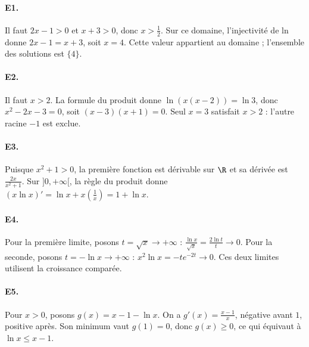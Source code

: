 \paragraph{E1.}Il faut $2x-1>0$ et $x+3>0$, donc $x>\frac{1}{2}$. Sur ce domaine, l'injectivité de ln donne $2x-1=x+3$, soit $x=4$. Cette valeur appartient au domaine ; l'ensemble des solutions est $\{4\}$.

\paragraph{E2.}Il faut $x>2$. La formule du produit donne $\ln(x(x-2))=\ln3$, donc $x^2-2x-3=0$, soit $(x-3)(x+1)=0$. Seul $x=3$ satisfait $x>2$ : l'autre racine $-1$ est exclue.

\paragraph{E3.}Puisque $x^2+1>0$, la première fonction est dérivable sur $\R$ et sa dérivée est $\frac{2x}{x^2+1}$. Sur $]0,+\infty[$, la règle du produit donne $(x\ln x)'=\ln x+x(\frac{1}{x})=1+\ln x$.

\paragraph{E4.}Pour la première limite, posons $t=\sqrt x\to+\infty$ : $\frac{\ln x}{\sqrt{x}}=\frac{2\ln t}{t}\to0$. Pour la seconde, posons $t=-\ln x\to+\infty$ : $x^2\ln x=-te^{-2t}\to0$. Ces deux limites utilisent la croissance comparée.

\paragraph{E5.}Pour $x>0$, posons $g(x)=x-1-\ln x$. On a $g'(x)=\frac{x-1}{x}$, négative avant $1$, positive après. Son minimum vaut $g(1)=0$, donc $g(x)\ge0$, ce qui équivaut à $\ln x\le x-1$.

